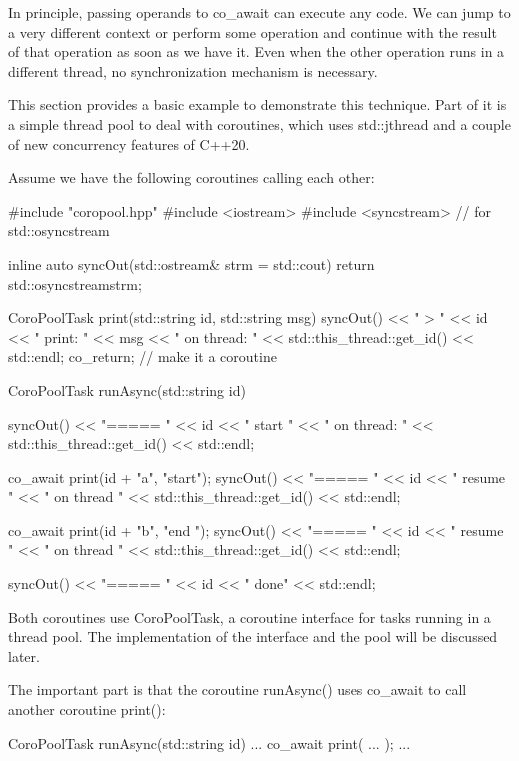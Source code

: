 

In principle, passing operands to co\_await can execute any code. We can jump to a very different context or perform some operation and continue with the result of that operation as soon as we have it. Even when the other operation runs in a different thread, no synchronization mechanism is necessary.

This section provides a basic example to demonstrate this technique. Part of it is a simple thread pool to deal with coroutines, which uses std::jthread and a couple of new concurrency features of C++20.


Assume we have the following coroutines calling each other:


\begin{cpp}
#include "coropool.hpp"
#include <iostream>
#include <syncstream> // for std::osyncstream

inline auto syncOut(std::ostream& strm = std::cout) {
	return std::osyncstream{strm};
}

CoroPoolTask print(std::string id, std::string msg)
{
	syncOut() << "       > " << id << " print: " << msg
			  << "       on thread: " << std::this_thread::get_id() << std::endl;
	co_return; // make it a coroutine
}

CoroPoolTask runAsync(std::string id)
{
	syncOut() << "===== " << id << " start "
			  << "   on thread: " << std::this_thread::get_id() << std::endl;

	co_await print(id + "a", "start");
	syncOut() << "===== " << id << " resume "
			  << "   on thread " << std::this_thread::get_id() << std::endl;

	co_await print(id + "b", "end ");
	syncOut() << "===== " << id << " resume "
			  << "   on thread " << std::this_thread::get_id() << std::endl;
	
	syncOut() << "===== " << id << " done" << std::endl;
}
\end{cpp}

Both coroutines use CoroPoolTask, a coroutine interface for tasks running in a thread pool. The implementation of the interface and the pool will be discussed later.

The important part is that the coroutine runAsync() uses co\_await to call another coroutine print():

\begin{cpp}
CoroPoolTask runAsync(std::string id)
{
	...
	co_await print( ... );
	...
}
\end{cpp}

